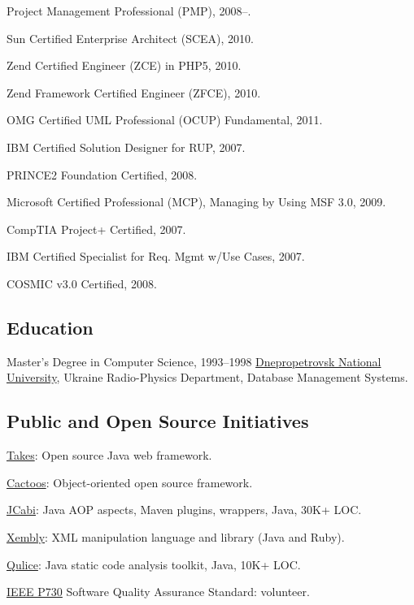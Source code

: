 Project Management Professional (PMP), 2008--.

Sun Certified Enterprise Architect (SCEA), 2010.

Zend Certified Engineer (ZCE) in PHP5, 2010.

Zend Framework Certified Engineer (ZFCE), 2010.

OMG Certified UML Professional (OCUP) Fundamental, 2011.

IBM Certified Solution Designer for RUP, 2007.

PRINCE2 Foundation Certified, 2008.

Microsoft Certified Professional (MCP), Managing by Using MSF 3.0, 2009.

CompTIA Project+ Certified, 2007.

IBM Certified Specialist for Req. Mgmt w/Use Cases, 2007.

COSMIC v3.0 Certified, 2008.

\subsection*{Education}

\begin{samepage}
Master's Degree in Computer Science, 1993--1998\newline
\href{http://dnu.dp.ua/}{Dnepropetrovsk National University}, Ukraine\newline
Radio-Physics Department, Database Management Systems.
\end{samepage}

\subsection*{Public and Open Source Initiatives}

\href{http://www.takes.org}{Takes}: Open source Java web framework.

\href{http://www.cactoos.org}{Cactoos}: Object-oriented open source framework.

\href{http://www.jcabi.com}{JCabi}: Java AOP aspects, Maven plugins, wrappers, Java, 30K+ LOC.

\href{http://www.xembly.org}{Xembly}: XML manipulation language and library (Java and Ruby).

\href{http://www.qulice.com}{Qulice}: Java static code analysis toolkit, Java, 10K+ LOC.

\href{http://ieeexplore.ieee.org/document/6835311/}{IEEE P730} Software Quality Assurance Standard: volunteer.


